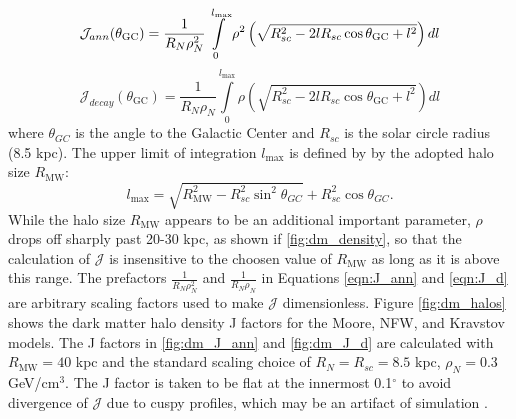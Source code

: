\begin{equation}
\mathcal{J}_{ann}(\theta_\textrm{GC})=\frac{1}{R_N\rho_N^2}\int\limits_0^{l_\textrm{max}} \rho^2 \left(\sqrt{R_{sc}^2-2lR_{sc}\cos{\theta_\textrm{GC}}+l^2}\right)dl\\
\label{eqn:J_ann}
\end{equation}
\begin{equation}
\mathcal{J}_{decay}(\theta_\textrm{GC})=\frac{1}{R_N\rho_N}\int\limits_0^{l_\textrm{max}} \rho \left(\sqrt{R_{sc}^2-2lR_{sc}\cos{\theta_\textrm{GC}}+l^2}\right)dl
\label{eqn:J_d}
\end{equation}
where $\theta_{GC}$ is the angle to the Galactic Center and $R_{sc}$ is the solar circle radius (8.5 kpc).  The upper limit of integration $l_\textrm{max}$ is defined by by the adopted halo size $R_{\textrm{MW}}$:
\begin{equation}
l_\textrm{max}=\sqrt{R^2_\textrm{MW}-R^2_{sc}\sin^2 \theta_{GC}} + R^2_{sc}\cos{\theta_{GC}}.
\label{eqn:l_max}
\end{equation}
While the halo size $R_{\textrm{MW}}$ appears to be an additional important parameter, $\rho$ drops off sharply past 20-30 kpc, as shown if \ref{fig:dm_density}, so that the calculation of $\mathcal{J}$ is insensitive to the choosen value of $R_{\textrm{MW}}$ as long as it is above this range.  The prefactors $\frac{1}{R_N\rho_N^2}$ and $\frac{1}{R_N\rho_N}$ in Equations \ref{eqn:J_ann} and \ref{eqn:J_d} are arbitrary scaling factors used to make $\mathcal{J}$ dimensionless.  Figure \ref{fig:dm_halos} shows the dark matter halo density J factors for the Moore, NFW, and Kravstov models.  The J factors in \ref{fig:dm_J_ann} and \ref{fig:dm_J_d} are calculated with $R_{\textrm{MW}}=40$ kpc and the standard scaling choice of $R_N=R_{sc}=8.5$ kpc, $\rho_N=0.3$ GeV/cm$^3$.  The J factor is taken to be flat at the innermost 0.1$^\circ$ to avoid divergence of $\mathcal{J}$ due to cuspy profiles, which may be an artifact of simulation \cite{Yuksel:2007jx}. 
